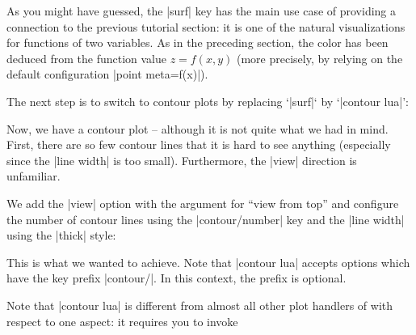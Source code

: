 As you might have guessed, the |surf| key has the main use case of providing a
connection to the previous tutorial section: it is one of the natural
visualizations for functions of two variables. As in the preceding section, the
color has been deduced from the function value $z=f(x,y)$ (more precisely, by
relying on the default configuration |point meta=f(x)|).

The next step is to switch to contour plots by replacing `|surf|` by
`|contour lua|':

\pgfplotsexpensiveexample
\begin{codeexample}[]
\end{codeexample}
%
Now, we have a contour plot -- although it is not quite what we had in mind.
First, there are so few contour lines that it is hard to see anything
(especially since the |line width| is too small). Furthermore, the |view|
direction is unfamiliar.

We add the |view| option with the argument for ``view from top'' and configure
the number of contour lines using the |contour/number| key and the |line width|
using the |thick| style:

\pgfplotsexpensiveexample
\begin{codeexample}[]
\end{codeexample}

This is what we wanted to achieve. Note that |contour lua| accepts options
which have the key prefix |contour/|. In this context, the prefix is optional.

Note that |contour lua| is different from almost all other plot handlers of
\PGFPlots{} with respect to one aspect: it requires you to invoke

